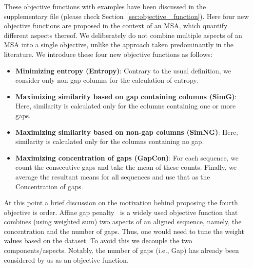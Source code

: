 These objective functions with examples have been discussed in the supplementary file (please check Section~\ref{sec:objective _function}). Here  four new objective functions are proposed in the context of an MSA, which quantify different aspects thereof. We deliberately do not combine multiple aspects of an MSA into a single objective, unlike the approach taken predominantly in the literature. We introduce these four new objective functions as follows: 

\begin{itemize}
	\item \textbf{Minimizing entropy (Entropy)}: Contrary to the usual definition, we consider only non-gap columns for the calculation of entropy.
	
	\item \textbf{Maximizing similarity based on gap containing columns (SimG)}: Here, similarity is calculated only for the columns containing one or more gaps. 
	
	\item \textbf{Maximizing similarity based on non-gap columns (SimNG)}: Here, similarity is calculated only for the columns containing no gap.	
	\item \textbf{Maximizing concentration of gaps (GapCon)}: For each sequence, we count the consecutive gaps and take the mean of these counts. Finally, we average the resultant means for all sequences and use that as the Concentration of gaps.
	
\end{itemize}
At this point a brief discussion on the motivation behind proposing the fourth objective is order. Affine gap penalty~\citep{rani2016multiple} is a widely used objective function that combines (using weighted sum) two aspects of an aligned sequence, namely, the concentration and the number of gaps. Thus, one would need to tune the weight values based on the dataset. To avoid this we decouple the two components/aspects. Notably, the number of gaps (i.e., Gap) has already been considered by us as an objective function. 


